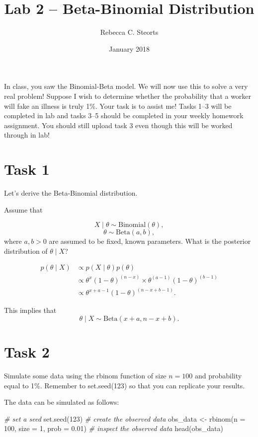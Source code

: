 \documentclass[
]{article}
\title{Lab 2 -- Beta-Binomial Distribution}
\author{Rebecca C. Steorts}
\date{January 2018}
\newenvironment{Shaded}{\begin{snugshade}}{\end{snugshade}}
\newcommand{\AttributeTok}[1]{\textcolor[rgb]{0.77,0.63,0.00}{#1}}
\newcommand{\CommentTok}[1]{\textcolor[rgb]{0.56,0.35,0.01}{\textit{#1}}}
\newcommand{\DecValTok}[1]{\textcolor[rgb]{0.00,0.00,0.81}{#1}}
\newcommand{\FloatTok}[1]{\textcolor[rgb]{0.00,0.00,0.81}{#1}}
\newcommand{\FunctionTok}[1]{\textcolor[rgb]{0.00,0.00,0.00}{#1}}
\newcommand{\NormalTok}[1]{#1}
\newcommand{\OtherTok}[1]{\textcolor[rgb]{0.56,0.35,0.01}{#1}}
\begin{document}
\maketitle

In class, you saw the Binomial-Beta model. We will now use this to solve
a very real problem! Suppose I wish to determine whether the probability
that a worker will fake an illness is truly 1\%. Your task is to assist
me! Tasks 1--3 will be completed in lab and tasks 3--5 should be
completed in your weekly homework assignment. You should still upload
task 3 even though this will be worked through in lab!

\hypertarget{task-1}{%
\section{Task 1}\label{task-1}}

Let's derive the Beta-Binomial distribution.

Assume that

\[X\mid \theta \sim \text{Binomial} (\theta),\]
\[\theta \sim \text{Beta}(a,b),\] where \(a,b > 0\) are assumed to be
fixed, known parameters. What is the posterior distribution of
\(\theta \mid X\)?

\begin{align}
p(\theta \mid X) &\propto 
p(X \mid \theta) p(\theta) \\
&\propto \theta^{x} 
(1 - \theta)^{(n-x)} \times \theta^{(a-1)} (1 - \theta)^{(b-1)}\\
&\propto \theta^{x + a -1} (1 - \theta)^{(n-x + b -1)}.
\end{align}

This implies that \[\theta \mid X \sim \text{Beta}(x+a,n-x+b).\]

\hypertarget{task-2}{%
\section{Task 2}\label{task-2}}

Simulate some data using the \textsf{rbinom} function of size
\(n = 100\) and probability equal to 1\%. Remember to
\textsf{set.seed(123)} so that you can replicate your results.

The data can be simulated as follows:

\begin{Shaded}
\begin{Highlighting}[]
\CommentTok{\# set a seed}
\FunctionTok{set.seed}\NormalTok{(}\DecValTok{123}\NormalTok{)}
\CommentTok{\# create the observed data}
\NormalTok{obs\_data }\OtherTok{\textless{}{-}} \FunctionTok{rbinom}\NormalTok{(}\AttributeTok{n =} \DecValTok{100}\NormalTok{, }\AttributeTok{size =} \DecValTok{1}\NormalTok{, }\AttributeTok{prob =} \FloatTok{0.01}\NormalTok{)}
\CommentTok{\# inspect the observed data}
\FunctionTok{head}\NormalTok{(obs\_data)}
\end{Highlighting}
\end{Shaded}
\end{document}
